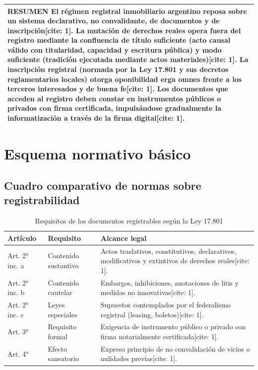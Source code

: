 \documentclass[12pt,oneside]{book}
\begin{document}
\begin{longtable}{|p{4.5cm}|p{10.5cm}|}
\multicolumn{2}{|p{15cm}|}{
\textbf{RESUMEN} \newline
El régimen registral inmobiliario argentino reposa sobre un sistema \textbf{declarativo}, \textbf{no convalidante}, \textbf{de documentos} y de \textbf{inscripción}[cite: 1]. La mutación de derechos reales opera fuera del registro mediante la confluencia de \textbf{título suficiente} (acto causal válido con titularidad, capacidad y escritura pública) y \textbf{modo suficiente} (tradición ejecutada mediante actos materiales)[cite: 1]. La inscripción registral (normada por la Ley 17.801 y sus decretos reglamentarios locales) otorga oponibilidad erga omnes frente a los \textbf{terceros interesados y de buena fe}[cite: 1]. Los documentos que acceden al registro deben constar en instrumentos públicos o privados con firma certificada, impulsándose gradualmente la informatización a través de la firma digital[cite: 1].
} \\ \hline
\end{longtable}


\appendix

\chapter{Esquema normativo básico}

\section{Cuadro comparativo de normas sobre registrabilidad}

\begin{table}[H]
\centering
\caption{Requisitos de los documentos registrables según la Ley 17.801}
\begin{tabular}{llp{7cm}}
\toprule
\textbf{Artículo} & \textbf{Requisito} & \textbf{Alcance legal} \\
\midrule
Art. 2° inc. a & Contenido sustantivo & Actos traslativos, constitutivos, declarativos, modificativos y extintivos de derechos reales[cite: 1]. \\
Art. 2° inc. b & Contenido cautelar & Embargos, inhibiciones, anotaciones de litis y medidas no innovativas[cite: 1]. \\
Art. 2° inc. c & Leyes especiales & Supuestos contemplados por el federalismo registral (leasing, boletos)[cite: 1]. \\
Art. 3° & Requisito formal & Exigencia de instrumento público o privado con firma notarialmente certificada[cite: 1]. \\
Art. 4° & Efecto saneatorio & Expreso principio de no convalidación de vicios o nulidades previas[cite: 1]. \\
\bottomrule
\end{tabular}
\end{table}
\end{document}

